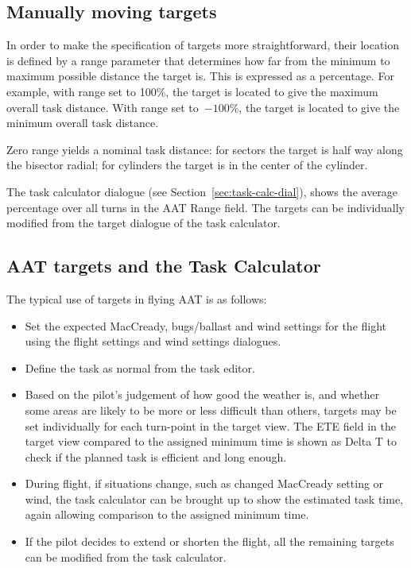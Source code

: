 \subsection*{Manually moving targets}

In order to make the specification of targets more straightforward,
their location is defined by a range parameter that determines how
far from the minimum to maximum possible distance the target is.  This
is expressed as a percentage.  For example, with range set to 100\%,
the target is located to give the maximum overall task distance.  With
range set to~$-100$\%, the target is located to give the minimum overall
task distance.  

Zero range yields a nominal task distance: for sectors the target is
half way along the bisector radial; for cylinders the target is in the
center of the cylinder.

The task calculator dialogue (see Section~\ref{sec:task-calc-dial}), shows the
average percentage over all turns in the AAT Range field.
The targets can be individually modified from the target dialogue of the task
calculator.


\subsection*{AAT targets and the Task Calculator}

The typical use of targets in flying AAT is as follows:
\begin{itemize}
\item Set the expected MacCready, bugs/ballast and wind settings
  for the flight using the flight settings and wind settings dialogues.
\item Define the task as normal from the task editor.
\item Based on the pilot's judgement of how good the weather is,
  and whether some areas are likely to be more or less difficult than
  others, targets may be set individually for each turn-point in the
  target view.  The ETE field in the target view compared to
  the assigned minimum time is shown as Delta T to check if the planned 
  task is efficient and long enough.
\item During flight, if situations change, such as changed MacCready setting
  or wind, the task calculator can be brought up to show the estimated
  task time, again allowing comparison to the assigned minimum time.
\item If the pilot decides to extend or shorten the flight, all the remaining
  targets can be modified from the task calculator. 
\end{itemize}

